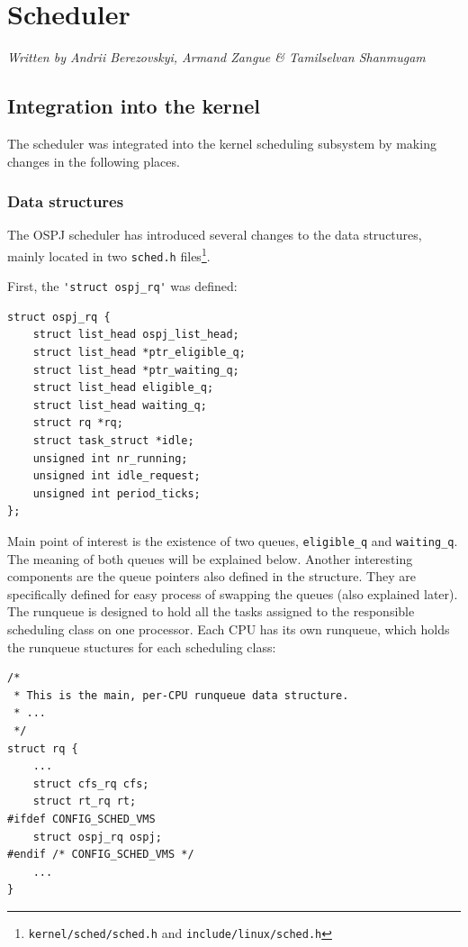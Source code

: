 \documentclass[]{report}
\begin{document}
\chapter{Scheduler}\label{scheduler}

\emph{Written by Andrii Berezovskyi, Armand Zangue \& Tamilselvan
Shanmugam}

\section{Integration into the kernel}\label{integration-into-the-kernel}

The scheduler was integrated into the kernel scheduling subsystem by
making changes in the following places.

\subsection{Data structures}\label{data-structures}

The OSPJ scheduler has introduced several changes to the data
structures, mainly located in two \lstinline!sched.h! files\footnote{\lstinline!kernel/sched/sched.h!
  and \lstinline!include/linux/sched.h!}.

First, the \lstinline!'struct ospj_rq'! was defined:

\begin{lstlisting}[style=c, caption=kernel/sched/sched.h, firstnumber=365]
struct ospj_rq {
    struct list_head ospj_list_head;
    struct list_head *ptr_eligible_q;
    struct list_head *ptr_waiting_q;
    struct list_head eligible_q;
    struct list_head waiting_q;
    struct rq *rq;
    struct task_struct *idle;
    unsigned int nr_running;
    unsigned int idle_request;
    unsigned int period_ticks;
};
\end{lstlisting}

Main point of interest is the existence of two queues,
\lstinline!eligible_q! and \lstinline!waiting_q!. The meaning of both
queues will be explained below. Another interesting components are the
queue pointers also defined in the structure. They are specifically
defined for easy process of swapping the queues (also explained later).
The runqueue is designed to hold all the tasks assigned to the
responsible scheduling class on one processor. Each CPU has its own
runqueue, which holds the runqueue stuctures for each scheduling class:

\begin{lstlisting}[style=c, caption=kernel/sched/sched.h, firstnumber=413]
/*
 * This is the main, per-CPU runqueue data structure.
 * ...
 */
struct rq {
    ...
    struct cfs_rq cfs;
    struct rt_rq rt;
#ifdef CONFIG_SCHED_VMS
    struct ospj_rq ospj;
#endif /* CONFIG_SCHED_VMS */
    ...
}
\end{lstlisting}
\end{document}
